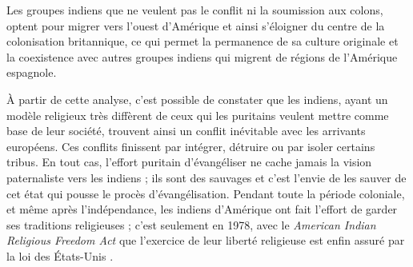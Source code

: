 \documentclass{article}
\begin{document}
Les groupes indiens que ne veulent pas le conflit ni la soumission aux colons, optent pour migrer vers l'ouest d'Amérique et ainsi s'éloigner du centre de la colonisation britannique, ce qui permet la permanence de sa culture originale et la coexistence avec autres groupes indiens qui migrent de régions de l'Amérique espagnole.

À partir de cette analyse, c'est possible de constater que les indiens, ayant un modèle religieux très diffèrent de ceux qui les puritains veulent mettre comme base de leur société, trouvent ainsi un conflit inévitable avec les arrivants européens. Ces conflits finissent par intégrer, détruire ou par isoler certains tribus. En tout cas, l'effort puritain d'évangéliser ne cache jamais la vision paternaliste vers les indiens ; ils sont des sauvages et c'est l'envie de les sauver de cet état qui pousse le procès d'évangélisation. Pendant toute la période coloniale, et même après l'indépendance, les indiens d'Amérique ont fait l'effort de garder ses traditions religieuses ; c'est seulement en 1978, avec le \emph{American Indian Religious Freedom Act} que l'exercice de leur liberté religieuse est enfin assuré par la loi des États-Unis \cite{code-10}.

\newpage
\end{document}

